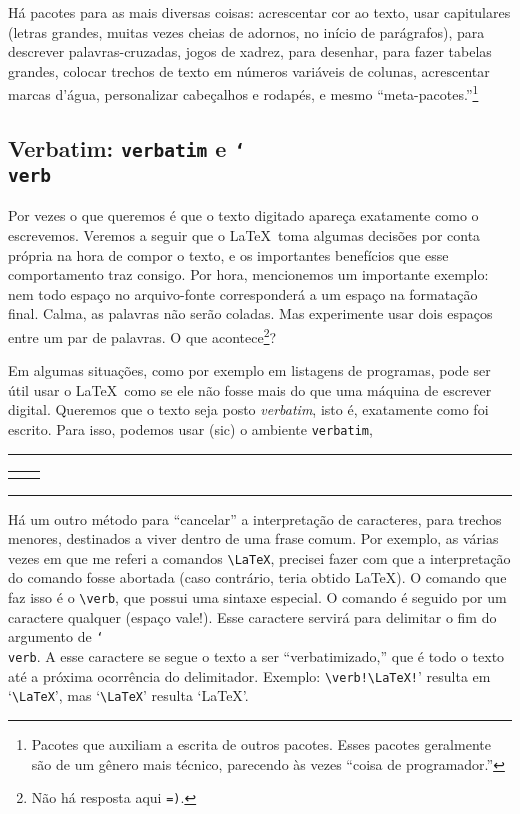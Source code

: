 Há pacotes para as mais diversas coisas: acrescentar cor ao texto,
usar capitulares (letras grandes, muitas vezes cheias de adornos, no
início de parágrafos), para descrever palavras-cruzadas, jogos de
xadrez, para desenhar, para fazer tabelas grandes, colocar trechos de
texto em números variáveis de colunas, acrescentar marcas d'água,
personalizar cabeçalhos e rodapés, e mesmo
``meta-pacotes.''\footnote{Pacotes que auxiliam a escrita de outros
  pacotes. Esses pacotes geralmente são de um gênero mais técnico,
  parecendo às vezes ``coisa de programador.''}

\subsection{Verbatim: \texttt{verbatim} e \texttt{\char`\\verb}}

Por vezes o que queremos é que o texto digitado apareça exatamente
como o escrevemos. Veremos a seguir que o \LaTeX\ toma algumas
decisões por conta própria na hora de compor o texto, e os importantes
benefícios que esse comportamento traz consigo. Por hora, mencionemos
um importante exemplo: nem todo espaço no arquivo-fonte corresponderá
a um espaço na formatação final. Calma, as palavras não serão
coladas. Mas experimente usar dois espaços entre um par de palavras. O
que acontece\footnote{Não há resposta aqui \texttt{=)}.}?

Em algumas situações, como por exemplo em listagens de programas, pode
ser útil usar o \LaTeX\ como se ele não fosse mais do que uma máquina
de escrever digital. Queremos que o texto seja posto \emph{verbatim},
isto é, exatamente como foi escrito. Para isso, podemos usar (sic) o
ambiente \verb'verbatim', 

\begin{center}\footnotesize\hrule\smallskip
\begin{tabular}{c|c}
\begin{minipage}{.5\textwidth}

\end{minipage} &
\begin{minipage}{.5\textwidth}

\end{minipage}
\end{tabular}
\smallskip\hrule
\end{center}

Há um outro método para ``cancelar'' a interpretação de caracteres,
para trechos menores, destinados a viver dentro de uma frase
comum. Por exemplo, as várias vezes em que me referi a comandos
\verb'\LaTeX', precisei fazer com que a interpretação do comando fosse
abortada (caso contrário, teria obtido \LaTeX). O comando que faz isso
é o \verb'\verb', que possui uma sintaxe especial. O comando é seguido
por um caractere qualquer (espaço vale!). Esse caractere servirá para
delimitar o fim do argumento de \texttt{\char`\\{}verb}. A esse
caractere se segue o texto a ser ``verbatimizado,'' que é todo o texto
até a próxima ocorrência do delimitador. Exemplo:
\verb'\verb!\LaTeX!'' resulta em `\verb!\LaTeX!', mas `\verb'\LaTeX''
resulta `\LaTeX'.


